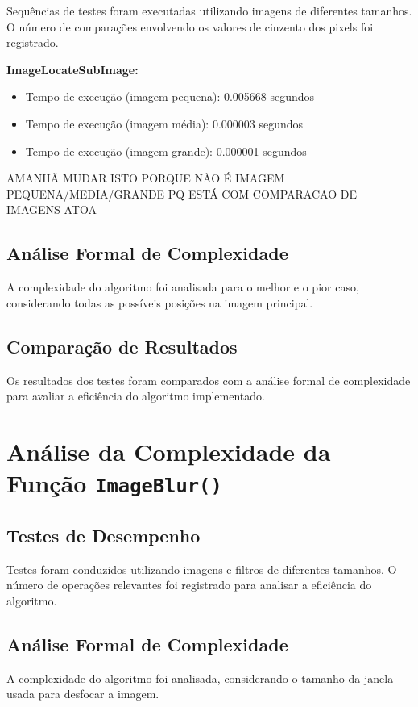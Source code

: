 \documentclass{article}
\begin{document}
Sequências de testes foram executadas utilizando imagens de diferentes tamanhos. O número de comparações envolvendo os valores de cinzento dos pixels foi registrado.
\item \textbf{ImageLocateSubImage:}
    \begin{itemize}
        \item Tempo de execução (imagem pequena): 0.005668 segundos
        \item Tempo de execução (imagem média): 0.000003 segundos
        \item Tempo de execução (imagem grande): 0.000001 segundos
    \end{itemize}

    AMANHÃ MUDAR ISTO PORQUE NÃO É IMAGEM PEQUENA/MEDIA/GRANDE PQ ESTÁ COM COMPARACAO DE IMAGENS ATOA


\subsection{Análise Formal de Complexidade}
A complexidade do algoritmo foi analisada para o melhor e o pior caso, considerando todas as possíveis posições na imagem principal.

\subsection{Comparação de Resultados}
Os resultados dos testes foram comparados com a análise formal de complexidade para avaliar a eficiência do algoritmo implementado.

\section{Análise da Complexidade da Função \texttt{ImageBlur()}}

\subsection{Testes de Desempenho}
Testes foram conduzidos utilizando imagens e filtros de diferentes tamanhos. O número de operações relevantes foi registrado para analisar a eficiência do algoritmo.

\subsection{Análise Formal de Complexidade}
A complexidade do algoritmo foi analisada, considerando o tamanho da janela usada para desfocar a imagem.
\end{document}
